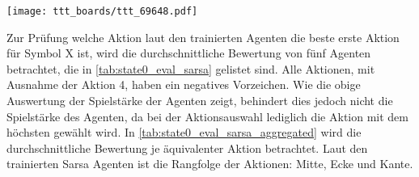 \begin{minipage}{\textwidth}
  \begin{minipage}[t]{0.49\textwidth}
    \centering
    \captionsetup{type=figure}
    \label{ttt_boards/ttt_69648}
    \texttt{[image: ttt\_boards/ttt\_69648.pdf]}
  \end{minipage}
  \hfill
  \begin{minipage}[t]{0.49\textwidth}
    \centering
    \captionsetup{type=table}
    \label{tab:state69648}
    
    \end{minipage}
\end{minipage}

Zur Prüfung welche Aktion laut den trainierten \sarsa Agenten die beste erste Aktion für Symbol X ist, wird die durchschnittliche Bewertung von fünf Agenten betrachtet, die in \cref{tab:state0_eval_sarsa} gelistet sind. 
Alle Aktionen, mit Ausnahme der Aktion 4, haben ein negatives Vorzeichen.
Wie die obige Auswertung der Spielstärke der \wtable Agenten zeigt, behindert dies jedoch nicht die Spielstärke des Agenten, da bei der Aktionsauswahl lediglich die Aktion mit dem höchsten \qValue gewählt wird. 
In \cref{tab:state0_eval_sarsa_aggregated} wird die durchschnittliche Bewertung je äquivalenter Aktion betrachtet.
Laut den trainierten Sarsa Agenten ist die Rangfolge der Aktionen: Mitte, Ecke und Kante. 

